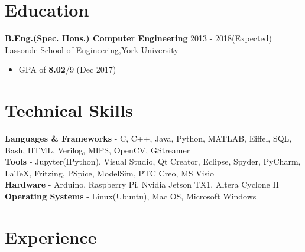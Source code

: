 \documentclass[margin, centered]{res}
\begin{document}
	\begin{resume}
		\section{Education}
		\textbf{B.Eng.(Spec. Hons.) Computer Engineering} \hfill 2013 - 2018(Expected) \\
		\href{http://lassonde.yorku.ca/}{Lassonde School of Engineering,York University}
		\begin{itemize}
			\item GPA of \textbf{8.02}/9 (Dec 2017)
		\end{itemize}
		
		\section{Technical \hspace{2mm} Skills}
		\textbf{Languages \& Frameworks} - C, C++, Java, Python, MATLAB, Eiffel, SQL, Bash, HTML, Verilog, MIPS, OpenCV, GStreamer \\
		\textbf{Tools} - Jupyter(IPython), Visual Studio, Qt Creator, Eclipse, Spyder, PyCharm, \LaTeX, Fritzing, PSpice, ModelSim, PTC Creo, MS Visio \\
		\textbf{Hardware} - Arduino, Raspberry Pi, Nvidia Jetson TX1, Altera Cyclone II \\
		\textbf{Operating Systems} - Linux(Ubuntu), Mac OS, Microsoft Windows
		\section{Experience}
		

\end{resume}
\end{document}
